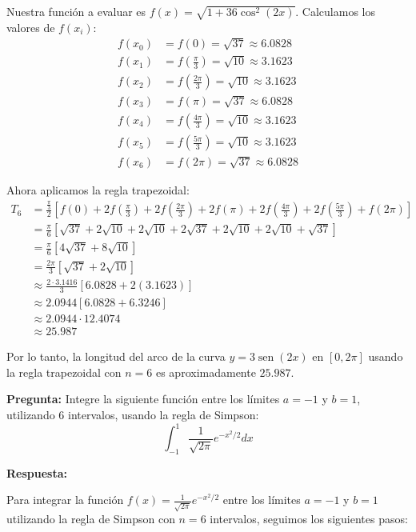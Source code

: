 \documentclass{article}
\begin{document}
\begin{enumerate}
    Nuestra función a evaluar es $f(x) = \sqrt{1 + 36\cos^2(2x)}$. Calculamos los valores de $f(x_i)$:
    \begin{align*}
        f(x_0) &= f(0) = \sqrt{37} \approx 6.0828 \\
        f(x_1) &= f(\frac{\pi}{3}) = \sqrt{10} \approx 3.1623 \\
        f(x_2) &= f(\frac{2\pi}{3}) = \sqrt{10} \approx 3.1623 \\
        f(x_3) &= f(\pi) = \sqrt{37} \approx 6.0828 \\
        f(x_4) &= f(\frac{4\pi}{3}) = \sqrt{10} \approx 3.1623 \\
        f(x_5) &= f(\frac{5\pi}{3}) = \sqrt{10} \approx 3.1623 \\
        f(x_6) &= f(2\pi) = \sqrt{37} \approx 6.0828
    \end{align*}

    Ahora aplicamos la regla trapezoidal:
    \begin{align*}
        T_6 &= \frac{\frac{\pi}{3}}{2} \left[ f(0) + 2f(\frac{\pi}{3}) + 2f(\frac{2\pi}{3}) + 2f(\pi) + 2f(\frac{4\pi}{3}) + 2f(\frac{5\pi}{3}) + f(2\pi) \right] \\
        &= \frac{\pi}{6} \left[ \sqrt{37} + 2\sqrt{10} + 2\sqrt{10} + 2\sqrt{37} + 2\sqrt{10} + 2\sqrt{10} + \sqrt{37} \right] \\
        &= \frac{\pi}{6} \left[ 4\sqrt{37} + 8\sqrt{10} \right] \\
        &= \frac{2\pi}{3} \left[ \sqrt{37} + 2\sqrt{10} \right] \\
        &\approx \frac{2 \cdot 3.1416}{3} [6.0828 + 2(3.1623)] \\
        &\approx 2.0944 [6.0828 + 6.3246] \\
        &\approx 2.0944 \cdot 12.4074 \\
        &\approx 25.987
    \end{align*}

    Por lo tanto, la longitud del arco de la curva $y = 3\operatorname{sen}(2x)$ en $[0, 2\pi]$ usando la regla trapezoidal con $n = 6$ es aproximadamente $25.987$.
\end{enumerate}

\textbf{Pregunta:} Integre la siguiente función entre los límites $a=-1$ y $b=1$, utilizando 6 intervalos, usando la regla de Simpson:
\[
\int_{-1}^{1} \frac{1}{\sqrt{2\pi}} e^{-x^2/2} dx
\]

\textbf{Respuesta:}

Para integrar la función $f(x) = \frac{1}{\sqrt{2\pi}} e^{-x^2/2}$ entre los límites $a = -1$ y $b = 1$ utilizando la regla de Simpson con $n = 6$ intervalos, seguimos los siguientes pasos:
\end{document}
